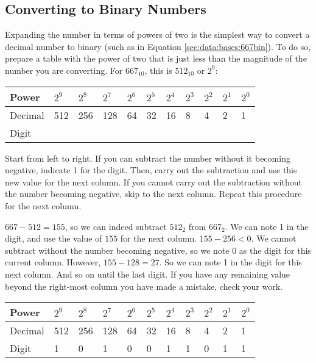 \documentclass[letterpaper, 10pt]{book}
\begin{document}
\subsection{Converting to Binary Numbers\label{sec:data:bases:bin}}

Expanding the number in terms of powers of two is the simplest way to convert a decimal number to binary 
(such as in Equation \ref{sec:data:bases:667bin}). To do so, prepare a table with the power of two that 
is just less than the magnitude of the number you are converting. 
For $667_{10}$, this is $512_{10}$ or $2^9$:

\noindent
\vspace{1em}
\begin{tabular}{|l|l|l|l|l|l|l|l|l|l|l|}\hline
Power & $2^9$ & $2^8$ & $2^7$ & $2^6$ & $2^5$ & $2^4$ & $2^3$ & $2^2$ & $2^1$ & $2^0$ \\\hline\hline
Decimal & 512 & 256 & 128 & 64 & 32 & 16 & 8 & 4 & 2 & 1 \\\hline
Digit &  &  &  &  &  &  &  &  &  &  \\\hline
\end{tabular}

\vspace{1em}
Start from left to right. If you can subtract the number without it becoming negative, indicate 1 for the digit. Then, carry out the subtraction and use this new value for the next column. If you cannot carry out the subtraction without the number becoming negative, skip to the next column. Repeat this procedure for the next column.

 $667-512=155$, so we can indeed subtract $512_2$ from $667_2$. We can note 1 in the digit, and use the value of $155$ for the next column. $155-256<0$. We cannot subtract without the number becoming negative, so we note 0 as the digit for this current column. However, $155-128=27$. So we can note 1 in the digit for this next column. And so on until the last digit. If you have any remaining value beyond the right-most column you have made a mistake, check your work.

\vspace{1em}
\begin{tabular}{|l|l|l|l|l|l|l|l|l|l|l|}\hline
Power & $2^9$ & $2^8$ & $2^7$ & $2^6$ & $2^5$ & $2^4$ & $2^3$ & $2^2$ & $2^1$ & $2^0$ \\\hline\hline
Decimal & 512 & 256 & 128 & 64 & 32 & 16 & 8 & 4 & 2 & 1 \\\hline
Digit & 1 & 0 & 1 & 0 & 0 & 1 & 1 & 0 & 1 & 1 \\\hline
\end{tabular}
\end{document}
